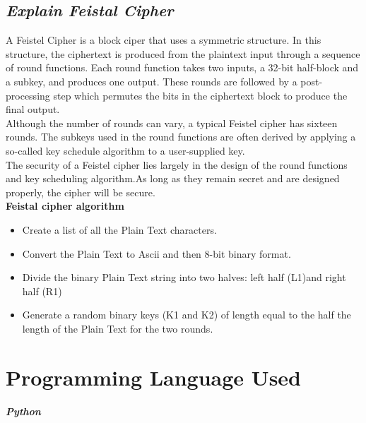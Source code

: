 \documentclass{article}
\begin{document}
\subsection{\textbf{\textit{Explain Feistal Cipher}}}
A Feistel Cipher is a block ciper that uses a symmetric structure. In this structure, the ciphertext is produced from the plaintext input through a sequence of round functions. Each round function takes two inputs, a 32-bit half-block and a subkey, and produces one output. These rounds are followed by a post-processing step which permutes the bits in the ciphertext block to produce the final output.\\
Although the number of rounds can vary, a typical Feistel cipher has sixteen rounds. The subkeys used in the round functions are often derived by applying a so-called key schedule algorithm to a user-supplied key.\\
The security of a Feistel cipher lies largely in the design of the round functions and key scheduling algorithm.As long as they remain secret and are designed properly, the cipher will be secure.\\

\textbf{Feistal cipher algorithm}
\begin{itemize}
	\item Create a list of all the Plain Text characters.
	\item Convert the Plain Text to Ascii and then 8-bit binary format.
	\item Divide the binary Plain Text string into two halves: left half (L1)and right half (R1)
	\item Generate a random binary keys (K1 and K2) of length equal to the half the length of the Plain Text for the two rounds.
\end{itemize}
\section{\textbf{Programming Language Used}}
\textbf{\textit{Python}}
\end{document}
